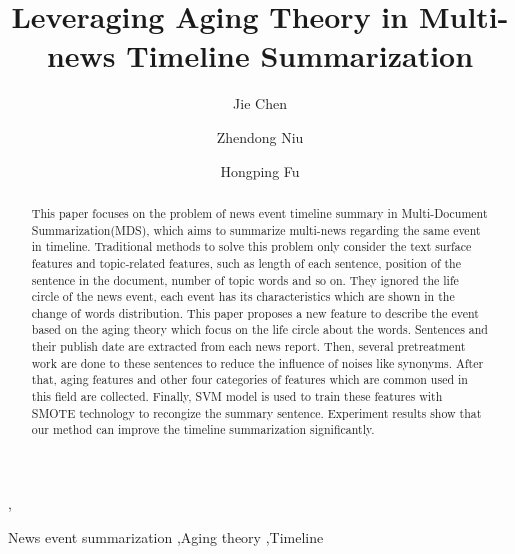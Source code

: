 \documentclass[print]{jicspack}
\begin{document}
\begin{premaker}


\title{Leveraging  Aging Theory in Multi-news Timeline Summarization}
\author[author1]{Jie Chen},
\author[author2]{Zhendong Niu}
\author[author3]{Hongping Fu}
\address[author1]{School of Computer Science, Beijing Institute of Technology, Beijing 100081, China}
\address[author2]{School of Computer Science, Beijing Institute of Technology, Beijing 100081, China}
\address[author3]{School of Computer Science, Beijing Institute of Technology, Beijing 100081, China}

\begin{abstract}
This paper focuses on the problem of news event timeline summary in Multi-Document Summarization(MDS), which aims to summarize multi-news regarding the same event in timeline.
Traditional methods to solve this problem only consider the text surface features and topic-related features, such as length of each sentence, position of the sentence in the document, number of topic words and so on.
They ignored the life circle of the news event, each event has its characteristics which are shown in the change of words distribution.
This paper proposes a new feature to describe the event based on the aging theory which focus on the life circle about the words.
Sentences and their publish date are extracted from each news report.
Then, several pretreatment work are done to these sentences to reduce the influence of noises like synonyms.
After that, aging features and other four categories of features which are common used in this field are collected.
Finally, SVM model is used to train these features with SMOTE technology to recongize the summary sentence.
Experiment results show that our method can improve the timeline summarization significantly.

\end{abstract}
\begin{keyword}
News event summarization \sep Aging theory \sep Timeline
\end{keyword}
\end{premaker}
\end{document}
